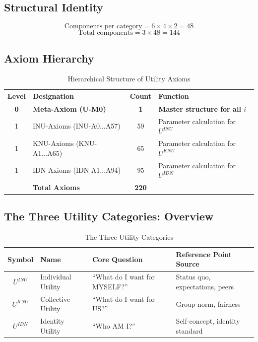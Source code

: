 \subsection{Structural Identity}

\begin{equation}
\text{Components per category} = 6 \times 4 \times 2 = 48
\end{equation}
\begin{equation}
\text{Total components} = 3 \times 48 = 144
\end{equation}

\subsection{Axiom Hierarchy}

\begin{table}[htbp]
\centering
\caption{Hierarchical Structure of Utility Axioms}
\label{tab:axiom-hierarchy}
\renewcommand{\arraystretch}{1.4}
\begin{tabular}{@{}clcl@{}}
\toprule
\textbf{Level} & \textbf{Designation} & \textbf{Count} & \textbf{Function} \\
\midrule
\textbf{0} & \textbf{Meta-Axiom (U-M0)} & \textbf{1} & \textbf{Master structure for all $i$} \\
\midrule
1 & INU-Axioms (INU-A0...A57) & 59 & Parameter calculation for $U^{INU}$ \\
1 & KNU-Axioms (KNU-A1...A65) & 65 & Parameter calculation for $U^{KNU}$ \\
1 & IDN-Axioms (IDN-A1...A94) & 95 & Parameter calculation for $U^{IDN}$ \\
\midrule
& \textbf{Total Axioms} & \textbf{220} & \\
\bottomrule
\end{tabular}
\end{table}

\subsection{The Three Utility Categories: Overview}

\begin{table}[htbp]
\centering
\caption{The Three Utility Categories}
\label{tab:app-c-three-categories}
\renewcommand{\arraystretch}{1.5}
\begin{tabular}{@{}clll@{}}
\toprule
\textbf{Symbol} & \textbf{Name} & \textbf{Core Question} & \textbf{Reference Point Source} \\
\midrule
$U^{INU}$ & Individual Utility & ``What do I want for MYSELF?'' & Status quo, expectations, peers \\
$U^{KNU}$ & Collective Utility & ``What do I want for US?'' & Group norm, fairness \\
$U^{IDN}$ & Identity Utility & ``Who AM I?'' & Self-concept, identity standard \\
\bottomrule
\end{tabular}
\end{table}


